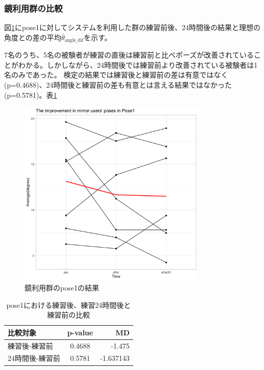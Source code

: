     \subsubsection{鏡利用群の比較}
      図\ref{fig:pose1_mirror}にpose1に対してシステムを利用した群の練習前後、24時間後の結果と理想の角度との差の平均\(\bar{\theta}_{\text{angle\_dif}}\)を示す。


      7名のうち、5名の被験者が練習の直後は練習前と比べポーズが改善されていることがわかる。しかしながら、24時間後では練習前より改善されている被験者は1名のみであった。
      検定の結果では練習後と練習前の差は有意ではなく(p=0.4688)、24時間後と練習前の差も有意とは言える結果ではなかった(p=0.5781)。表\ref{table:pose1_mirror_p_value}

      \begin{figure}[H]
        \begin{center}
        \includegraphics[width=9cm]{figures/pose1_system_false_graph.png}
        \caption{鏡利用群のpose1の結果}
        \label{fig:pose1_mirror}
        \end{center}
      \end{figure}

      \begin{table}[h]
        \centering
        \caption{pose1における練習後、練習24時間後と練習前の比較}
        \begin{tabular}{lcr}
        \hline
        \textbf{比較対象} & \textbf{p-value} & \textbf{MD} \\ \hline
        練習後-練習前 & 0.4688 & -1.475 \\ \hline
        24時間後-練習前 & 0.5781 & -1.637143 \\ \hline
        \end{tabular}
        \label{table:pose1_mirror_p_value}
        \end{table}


